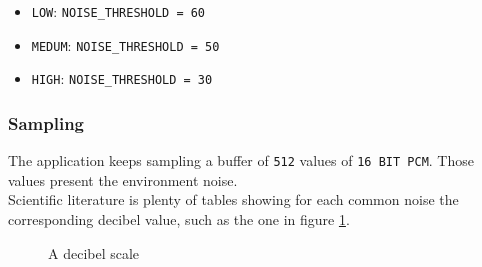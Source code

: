 \documentclass[conference, 11pt]{IEEEtran}
\begin{document}
\begin{itemize}
	\item \texttt{LOW}: \texttt{NOISE\_THRESHOLD = 60}
	\item \texttt{MEDUM}:  \texttt{NOISE\_THRESHOLD = 50}
	\item \texttt{HIGH}:  \texttt{NOISE\_THRESHOLD = 30}
\end{itemize}

\subsubsection{\textbf{Sampling}}
The application keeps sampling a buffer of \texttt{512} values of \texttt{16 BIT PCM}. Those values present the environment noise.\\ Scientific literature is plenty of tables showing for each common noise the corresponding decibel value, such as the one in figure \ref{img:decibels}. 

\begin{figure}[!ht]
\begin{center}
\caption{A decibel scale}
\label{img:decibels}
\end{center}
\end{figure}
\end{document}
